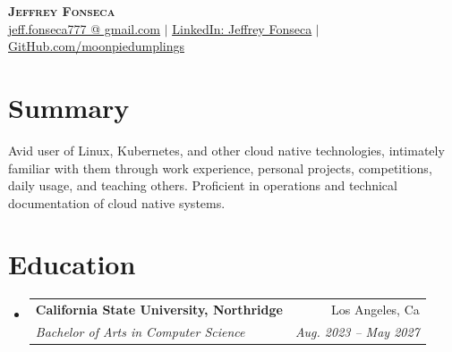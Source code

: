 \documentclass[letterpaper,11pt]{article}
\makeatletter
\newcommand{\resumeSubheading}[4]{
  \vspace{-2pt}\item
    \begin{tabular*}{0.97\textwidth}[t]{l@{\extracolsep{\fill}}r}
      \textbf{#1} & #2 \\
      \textit{\small#3} & \textit{\small #4} \\
    \end{tabular*}\vspace{-7pt}
}
\newcommand{\resumeSubHeadingListStart}{\begin{itemize}[leftmargin=0.15in, label={}]}
\newcommand{\resumeSubHeadingListEnd}{\end{itemize}}
\makeatother
\begin{document}

\begin{center}
    \textbf{\Huge \scshape Jeffrey Fonseca} \\ \vspace{1pt}
    \small \href{mailto:jeff.fonseca777 [at] gmail.com}{\underline{jeff.fonseca777 @ gmail.com}} $|$ 
    \href{https://www.linkedin.com/in/jeffrey-fonseca-4242521a4/}{\underline{LinkedIn: Jeffrey Fonseca}} $|$
    \href{https://github.com/moonpiedumplings}{\underline{GitHub.com/moonpiedumplings}}
\end{center}

\section{Summary}

\small{Avid user of Linux, Kubernetes, and other cloud native technologies, intimately familiar with them through work experience, personal projects, competitions, daily usage, and teaching others. Proficient in operations and technical documentation of cloud native systems. \vspace{-2pt}}

\section{Education}
  \resumeSubHeadingListStart
    \resumeSubheading
      {California State University, Northridge}{Los Angeles, Ca}
      {Bachelor of Arts in Computer Science}{Aug. 2023 -- May 2027}
  \resumeSubHeadingListEnd


\end{document}
